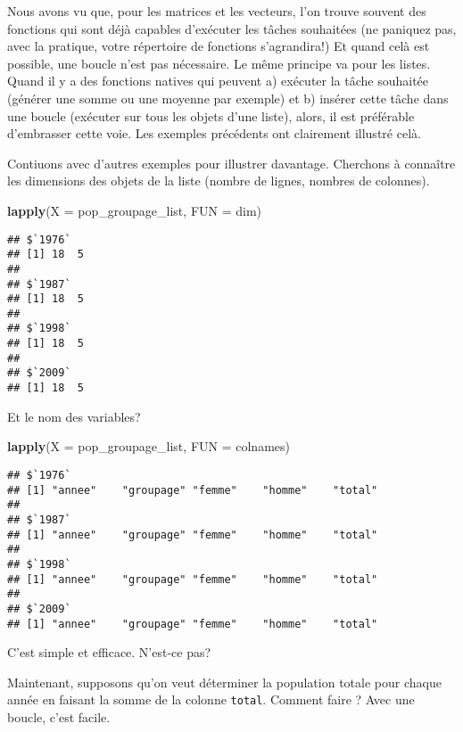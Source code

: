 \documentclass[]{book}
\newenvironment{Shaded}{\begin{snugshade}}{\end{snugshade}}
\newcommand{\KeywordTok}[1]{\textcolor[rgb]{0.13,0.29,0.53}{\textbf{#1}}}
\newcommand{\DataTypeTok}[1]{\textcolor[rgb]{0.13,0.29,0.53}{#1}}
\newcommand{\NormalTok}[1]{#1}
\begin{document}
Nous avons vu que, pour les matrices et les vecteurs, l'on trouve
souvent des fonctions qui sont déjà capables d'exécuter les tâches
souhaitées (ne paniquez pas, avec la pratique, votre répertoire de
fonctions s'agrandira!) Et quand celà est possible, une boucle n'est pas
nécessaire. Le même principe va pour les listes. Quand il y a des
fonctions natives qui peuvent a) exécuter la tâche souhaitée (générer
une somme ou une moyenne par exemple) et b) insérer cette tâche dans une
boucle (exécuter sur tous les objets d'une liste), alors, il est
préférable d'embrasser cette voie. Les exemples précédents ont
clairement illustré celà.

Contiuons avec d'autres exemples pour illustrer davantage. Cherchons à
connaître les dimensions des objets de la liste (nombre de lignes,
nombres de colonnes).

\begin{Shaded}
\begin{Highlighting}[]
\KeywordTok{lapply}\NormalTok{(}\DataTypeTok{X =}\NormalTok{ pop_groupage_list, }\DataTypeTok{FUN =}\NormalTok{ dim)}
\end{Highlighting}
\end{Shaded}

\begin{verbatim}
## $`1976`
## [1] 18  5
## 
## $`1987`
## [1] 18  5
## 
## $`1998`
## [1] 18  5
## 
## $`2009`
## [1] 18  5
\end{verbatim}

Et le nom des variables?

\begin{Shaded}
\begin{Highlighting}[]
\KeywordTok{lapply}\NormalTok{(}\DataTypeTok{X =}\NormalTok{ pop_groupage_list, }\DataTypeTok{FUN =}\NormalTok{ colnames)}
\end{Highlighting}
\end{Shaded}

\begin{verbatim}
## $`1976`
## [1] "annee"    "groupage" "femme"    "homme"    "total"   
## 
## $`1987`
## [1] "annee"    "groupage" "femme"    "homme"    "total"   
## 
## $`1998`
## [1] "annee"    "groupage" "femme"    "homme"    "total"   
## 
## $`2009`
## [1] "annee"    "groupage" "femme"    "homme"    "total"
\end{verbatim}

C'est simple et efficace. N'est-ce pas?

Maintenant, supposons qu'on veut déterminer la population totale pour
chaque année en faisant la somme de la colonne \texttt{total}. Comment
faire ? Avec une boucle, c'est facile.
\end{document}
